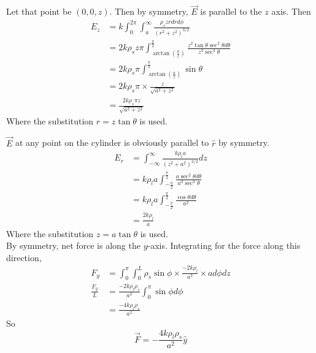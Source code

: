 \documentclass[answers]{exam}
\begin{document}
\begin{questions}

\begin{solution}
	Let that point be $(0,0,z)$. Then by symmetry, $\vec{E}$ is parallel to the $z$ axis. Then
	\begin{align*}
		E_z &= k\int_0^{2\pi}\int_a^\infty \frac{\rho_szrdrd\phi}{(r^2+z^2)^{3/2}} \\
			&= 2k\rho_sz\pi \int_{\arctan\left(\frac{a}{z}\right)}^{\frac{\pi}{2}} \frac{z^2\tan\theta\sec^2\theta d\theta}{z^3\sec^3\theta} \\
			&= 2k\rho_s\pi \int_{\arctan\left(\frac{a}{z}\right)}^{\frac{\pi}{2}} \sin\theta \\
			&= 2k\rho_s\pi \times \frac{z}{\sqrt{a^2+z^2}} \\
			&= \frac{2k\rho_s\pi z}{\sqrt{a^2+z^2}}
	\end{align*}
	Where the substitution $r=z\tan\theta$ is used.
\end{solution}

 \label{this}

\begin{solution}
	$\vec{E}$ at any point on the cylinder is obviously parallel to $\hat{r}$ by symmetry.
	\begin{align*}
		E_r &= \int_{-\infty}^\infty \frac{k\rho_la}{(z^2+a^2)^{3/2}} dz \\
		    &= k\rho_la \int_{-\frac{\pi}{2}}^{\frac{\pi}{2}} \frac{a\sec^2\theta d\theta}{a^3\sec^3\theta} \\
		    &= k\rho_la \int_{-\frac{\pi}{2}}^{\frac{\pi}{2}} \frac{\cos\theta d\theta}{a^2} \\
		    &= \frac{2k\rho_l}{a}
	\end{align*}
	Where the substitution $z=a\tan\theta$ is used. \\
	By symmetry, net force is along the $y$-axis. Integrating for the force along this direction,
	\begin{align*}
		F_y &= \int_0^\pi\int_0^L \rho_s\sin\phi \times \frac{-2k\rho_l}{a^3} \times ad\phi dz \\
		\frac{F_y}{L} &= \frac{-2k\rho_l\rho_s}{a^2} \int_0^\pi \sin\phi d\phi \\
			      &= \frac{-4k\rho_l\rho_s}{a^2}
	\end{align*}
	So
	$$\vec{F} = -\frac{4k\rho_l\rho_s}{a^2}\hat{y}$$
\end{solution}


\end{questions}
\end{document}
